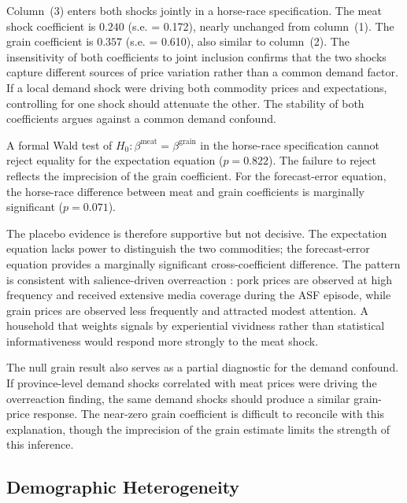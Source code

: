 Column~(3) enters both shocks jointly in a horse-race
specification.
The meat shock coefficient is $0.240$ (s.e. = 0.172),
nearly unchanged from column~(1).
The grain coefficient is $0.357$ (s.e. = 0.610), also
similar to column~(2).
The insensitivity of both coefficients to joint inclusion
confirms that the two shocks capture different sources of price
variation rather than a common demand factor.
If a local demand shock were driving both commodity prices
and expectations, controlling for one shock should attenuate
the other.
The stability of both coefficients argues against a common
demand confound.

A formal Wald test of $H_0\colon \beta^{\text{meat}} =
\beta^{\text{grain}}$ in the horse-race specification cannot
reject equality for the expectation equation ($p = 0.822$).
The failure to reject reflects the imprecision of the grain
coefficient.
For the forecast-error equation, the horse-race difference
between meat and grain coefficients is marginally significant
($p = 0.071$).

The placebo evidence is therefore supportive but not decisive.
The expectation equation lacks power to distinguish the two
commodities; the forecast-error equation provides a marginally
significant cross-coefficient difference.
The pattern is consistent with salience-driven overreaction
\citep{Cavallo2017, DacuntoHoangPirolliWeber2021}: pork
prices are observed at high frequency and received extensive
media coverage during the ASF episode, while grain prices are
observed less frequently and attracted modest attention.
A household that weights signals by experiential vividness
rather than statistical informativeness would respond more
strongly to the meat shock.

The null grain result also serves as a partial diagnostic for
the demand confound.
If province-level demand shocks correlated with meat prices
were driving the overreaction finding, the same demand shocks
should produce a similar grain-price response.
The near-zero grain coefficient is difficult to reconcile
with this explanation, though the imprecision of the grain
estimate limits the strength of this inference.

\subsection{Demographic Heterogeneity}\label{sec:demo_het}

